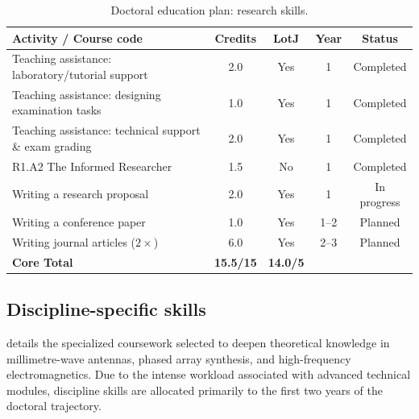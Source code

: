 \begin{table}[!ht]
    \centering
    \caption{Doctoral education plan: research skills.}
    \label{tab:research-skills}
    \small
    \begin{tabularx}{\textwidth}{Xcccc}
        \toprule
        \textbf{Activity / Course code} & \textbf{Credits} & \textbf{LotJ} & \textbf{Year} & \textbf{Status} \\
        \midrule
        Teaching assistance: laboratory/tutorial support & 2.0 & Yes & 1 & Completed \\
        Teaching assistance: designing examination tasks & 1.0 & Yes & 1 & Completed \\
        Teaching assistance: technical support \& exam grading & 2.0 & Yes & 1 & Completed \\
        R1.A2 \textbar{} The Informed Researcher & 1.5 & No & 1 & Completed \\
        Writing a research proposal & 2.0 & Yes & 1 & In progress \\
        Writing a conference paper & 1.0 & Yes & 1--2 & Planned \\
        Writing journal articles ($2\times$) & 6.0 & Yes & 2--3 & Planned \\
        \midrule
        \textbf{Core Total} & \textbf{15.5/15} & \textbf{14.0/5} & & \\
        \bottomrule
    \end{tabularx}
\end{table}


\subsection{Discipline-specific skills}
\label{sec:discipline-skills}

 details the specialized coursework selected to deepen theoretical knowledge in millimetre-wave antennas, phased array synthesis, and high-frequency electromagnetics.
Due to the intense workload associated with advanced technical modules, discipline skills are allocated primarily to the first two years of the doctoral trajectory.

